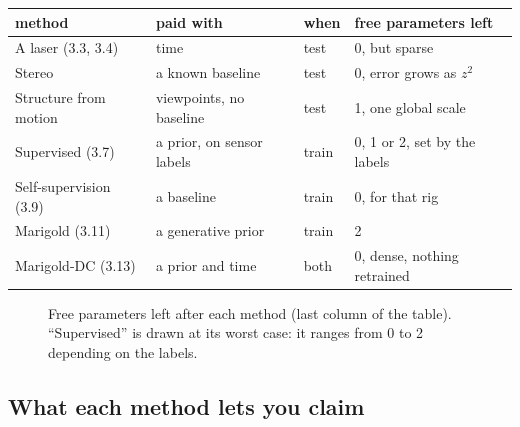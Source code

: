 \documentclass[11pt,a4paper]{article}
\numberwithin{equation}{section}
\theoremstyle{plain}
\theoremstyle{definition}
\begin{document}
\begin{center}\small
\begin{tabular}{@{}p{3.4cm}p{3.6cm}l p{4.2cm}@{}}\toprule
method & paid with & when & free parameters left\\\midrule
A laser (3.3, 3.4) & time & test & 0, but sparse\\
Stereo & a known baseline & test & 0, error grows as $z^2$\\
Structure from motion & viewpoints, no baseline & test & 1, one global scale\\
Supervised (3.7) & a prior, on sensor labels & train & 0, 1 or 2, set by the labels\\
Self-supervision (3.9) & a baseline & train & 0, for that rig\\
Marigold (3.11) & a generative prior & train & 2\\
Marigold-DC (3.13) & a prior and time & both & 0, dense, nothing retrained\\\bottomrule
\end{tabular}
\end{center}

\begin{figure}[H]
\centering
{}
\caption{Free parameters left after each method (last column of the table). ``Supervised'' is drawn at its worst case: it ranges from 0 to 2 depending on the labels.}
\end{figure}

\subsection*{What each method lets you claim}
\end{document}
